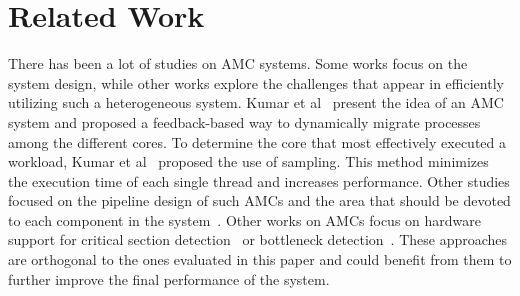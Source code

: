 \chapter{Related Work}
\label{sec.related}

There has been a lot of studies on AMC systems. Some works focus on the system design, while other works explore the challenges that appear in efficiently utilizing such a heterogeneous system.
Kumar et al~\cite{Kumar_micro_2003} present the idea of an AMC system and proposed a feedback-based way to dynamically migrate processes among the different cores. 
To determine the core that most effectively executed a workload, Kumar et al~\cite{Kumar:ISCA2004} proposed the use of sampling. This method minimizes the execution time of each single thread and increases performance. Other studies focused on the pipeline design of such AMCs and the area that should be devoted to each component in the system~\cite{Balakrishnan:ISCA2005, Morad_area_based}. Other works on AMCs focus on hardware support for critical section detection~\cite{Suleman:APLOS2009} or bottleneck detection~\cite{Joao:ASPLOS2012,Joao:ISCA2013}.
These approaches are orthogonal to the ones evaluated in this paper and could benefit from them to further improve the final performance of the system.

